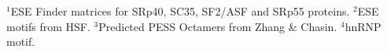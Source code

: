 \documentclass[10pt]{article}
\begin{document}
\begin{table}[!ht]
\begin{tabular}{lp{1cm}p{3cm}llll}
\end{tabular}
\begin{flushleft}
    $^{1}$ESE Finder matrices for SRp40, SC35, SF2/ASF and SRp55 proteins.
    $^{2}$ESE motifs from HSF.
    $^{3}$Predicted PESS Octamers from Zhang \& Chasin.
    $^{4}$hnRNP motif.
\end{flushleft}
\label{tab:spliceosome}
\end{table}
\end{document}
